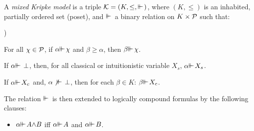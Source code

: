 \documentclass{jancl}
\begin{document}
\begin{definition}
 A \emph{mixed Kripke model} is a triple ${\cal
K}=(K,{\leq},{\ifmmode{ {\vdash}\mkern-7.6mu
{\vdash}\mkern2mu}\else{ {\vdash}\kern-.28em
{\vdash}\hskip1pt\ }\fi\relax})$, where $(K,{\leq})$ is an inhabited, partially
ordered set (poset), and ${\ifmmode{ {\vdash}\mkern-7.6mu
{\vdash}\mkern2mu}\else{ {\vdash}\kern-.28em
{\vdash}\hskip1pt\ }\fi\relax}$ a binary relation on $K \times
{\cal P}$ such that:
\begin{janclenum}{\arabic}{)}
\item For all ${\chi} \in {\cal P}$, if ${\alpha} {\ifmmode{ {\vdash}\mkern-7.6mu
{\vdash}\mkern2mu}\else{ {\vdash}\kern-.28em
{\vdash}\hskip1pt\ }\fi\relax} {\chi}$ and ${\beta} {\geq}
{\alpha}$, then ${\beta} {\ifmmode{ {\vdash}\mkern-7.6mu
{\vdash}\mkern2mu}\else{ {\vdash}\kern-.28em
{\vdash}\hskip1pt\ }\fi\relax} {\chi}$.

\item If ${\alpha} {\ifmmode{ {\vdash}\mkern-7.6mu
{\vdash}\mkern2mu}\else{ {\vdash}\kern-.28em
{\vdash}\hskip1pt\ }\fi\relax} \perp$, then, for all classical or
intuitionistic variable $X_s$, ${\alpha} {\ifmmode{ {\vdash}\mkern-7.6mu
{\vdash}\mkern2mu}\else{ {\vdash}\kern-.28em
{\vdash}\hskip1pt\ }\fi\relax} X_s$.

\item If ${\alpha} {\ifmmode{ {\vdash}\mkern-7.6mu
{\vdash}\mkern2mu}\else{ {\vdash}\kern-.28em
{\vdash}\hskip1pt\ }\fi\relax} X_c$ and, ${\alpha} \not {\ifmmode{ {\vdash}\mkern-7.6mu
{\vdash}\mkern2mu}\else{ {\vdash}\kern-.28em
{\vdash}\hskip1pt\ }\fi\relax} \perp$, then for
each ${\beta} \in K$: ${\beta} {\ifmmode{ {\vdash}\mkern-7.6mu
{\vdash}\mkern2mu}\else{ {\vdash}\kern-.28em
{\vdash}\hskip1pt\ }\fi\relax} X_c$.
\end{janclenum}
The relation ${\ifmmode{ {\vdash}\mkern-7.6mu
{\vdash}\mkern2mu}\else{ {\vdash}\kern-.28em
{\vdash}\hskip1pt\ }\fi\relax}$ is then extended to logically compound formulas by the following clauses:
\begin{itemize}

\item ${\alpha} {\ifmmode{ {\vdash}\mkern-7.6mu
{\vdash}\mkern2mu}\else{ {\vdash}\kern-.28em
{\vdash}\hskip1pt\ }\fi\relax} A {\wedge} B $ iff ${\alpha} {\ifmmode{ {\vdash}\mkern-7.6mu
{\vdash}\mkern2mu}\else{ {\vdash}\kern-.28em
{\vdash}\hskip1pt\ }\fi\relax} A$ and ${\alpha} {\ifmmode{ {\vdash}\mkern-7.6mu
{\vdash}\mkern2mu}\else{ {\vdash}\kern-.28em
{\vdash}\hskip1pt\ }\fi\relax}
B$.


\end{itemize}
\end{definition}
\end{document}
